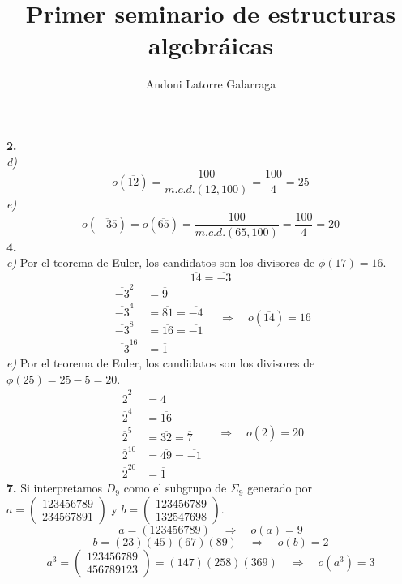 \documentclass{article}
\title{Primer seminario de estructuras algebráicas}
\author{Andoni Latorre Galarraga}
\date{}
\begin{document}
\maketitle
\noindent \textbf{2.}\\
\textit{d)}
$$
o(\overline{12})=\frac{100}{m.c.d.(12,100)}=\frac{100}{4}=25
$$
\textit{e)}
$$
o(\overline{-35})=o(\overline{65})=\frac{100}{m.c.d.(65,100)}=\frac{100}{4}=20
$$
\textbf{4.}\\
\textit{c)}
Por el teorema de Euler, los candidatos son los divisores de $\phi(17)=16$.
$$
\overline{14} = \overline{-3}
$$
$$
\begin{array}{ll}
  \overline{-3}^2    & = \overline{9}\\
  \overline{-3}^4    & = \overline{81}=\overline{-4}\\
  \overline{-3}^8    & = \overline{16}=\overline{-1}\\
  \overline{-3}^{16} & = \overline{1}
\end{array}\quad \Rightarrow \quad o(\overline{14})=16
$$
\textit{e)}
Por el teorema de Euler, los candidatos son los divisores de $\phi(25)=25-5=20$.
$$
\begin{array}{ll}
  \overline{2}^2    & =\overline{4}\\
  \overline{2}^4    & =\overline{16}\\
  \overline{2}^5    & =\overline{32}=\overline{7}\\
  \overline{2}^{10} & =\overline{49}=\overline{-1}\\
  \overline{2}^{20} & =\overline{1}
\end{array}\quad \Rightarrow \quad o(\overline{2})=20
$$
\textbf{7.}
Si interpretamos $D_9$ como el subgrupo de $\Sigma_9$ generado por $a=\left(\begin{array}{c}123456789\\234567891\end{array}\right)$ y $b= \left(\begin{array}{c}123456789\\132547698\end{array}\right)$.
$$
a = (123456789) \quad \Rightarrow \quad o(a)=9
$$
$$
b=(23)(45)(67)(89) \quad \Rightarrow \quad o(b)=2
$$
$$
a^3=\left(\begin{array}{c}123456789\\456789123\end{array}\right)
= (147)(258)(369) \quad \Rightarrow \quad o(a^3)=3
$$
\end{document}
